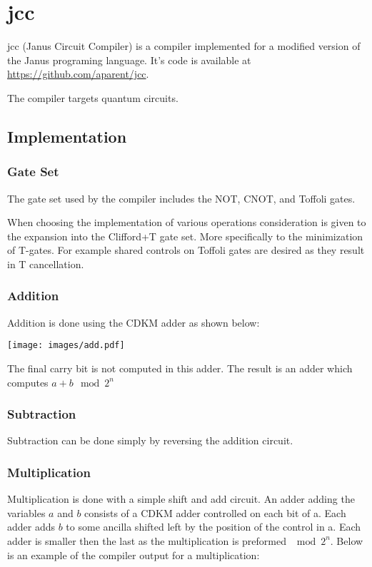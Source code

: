 \chapter{jcc}
jcc (Janus Circuit Compiler) is a compiler implemented for a modified version of the Janus programing language\cite{YG:2007}.
It's code is available at \url{https://github.com/aparent/jcc}.

The compiler targets quantum circuits.
\section{Implementation}
\subsection{Gate Set}

The gate set used by the compiler includes the NOT, CNOT, and Toffoli gates.

When choosing the implementation of various operations consideration is given to the expansion into the Clifford+T gate set. More specifically to the minimization of T-gates. For example shared controls on Toffoli gates are desired as they result in T cancellation.

\subsection{Addition}
Addition is done using the CDKM\cite{CDKM:2004} adder as shown below:


\texttt{[image: images/add.pdf]}

The final carry bit is not computed in this adder.
The result is an adder which computes $a+b \mod 2^n$

\subsection{Subtraction}
Subtraction can be done simply by reversing the addition circuit.

\subsection{Multiplication}
Multiplication is done with a simple shift and add circuit.
An adder adding the variables $a$ and $b$ consists of a CDKM\cite{CDKM:2004} adder controlled on each bit of a.
Each adder adds $b$ to some ancilla shifted left by the position of the control in a.
Each adder is smaller then the last as the multiplication is preformed $\mod 2^n$.
Below is an example of the compiler output for a multiplication:

